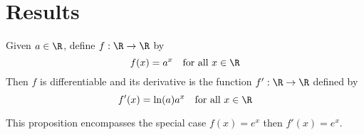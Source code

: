 

\section*{Results}

\begin{proposition}
Given $a \in \R $, define $f: \R  \to \R $ by
\[
f(x) = a^x \quad \text{for all } x \in \R
\]
Then $f$ is differentiable and its derivative is the function $f': \R  \to \R $ defined by
\[
f'(x) = \ln(a)a^x \quad \text{for all } x \in \R
\]
\end{proposition}

This proposition encompasses the special case $f(x) = e^x$ then $f'(x) = e^x$.

\blankpage
